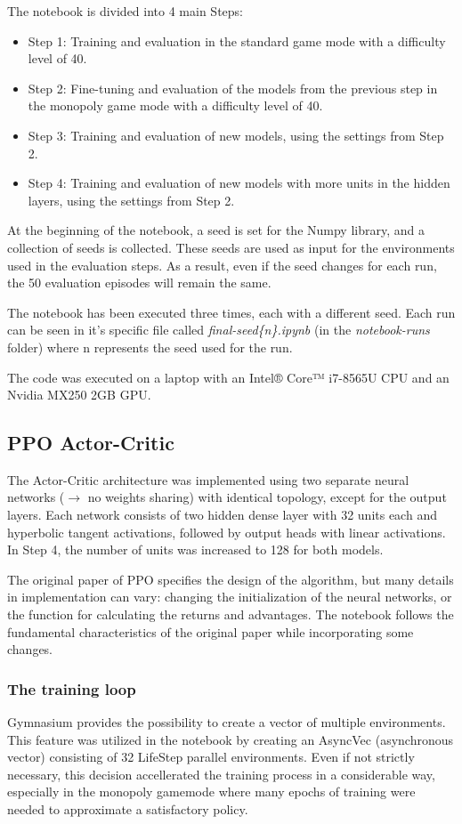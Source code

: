 \documentclass{article}
\begin{document}
The notebook is divided into 4 main Steps:
\begin{itemize}
    \item Step 1: Training and evaluation in the standard game mode with a difficulty level of 40.
    \item Step 2: Fine-tuning and evaluation of the models from the previous step in the monopoly game mode with a difficulty level of 40.
    \item Step 3: Training and evaluation of new models, using the settings from Step 2.
    \item Step 4: Training and evaluation of new models with more units in the hidden layers, using the settings from Step 2.
\end{itemize}

At the beginning of the notebook, a seed is set for the Numpy library, and a collection of seeds is collected. These seeds are used as input for the environments used in the evaluation steps. As a result, even if the seed changes for each run, the 50 evaluation episodes will remain the same.

The notebook has been executed three times, each with a different seed. Each run can be seen in it's specific file called \textit{final-seed\{n\}.ipynb} (in the \textit{notebook-runs} folder) where n represents the seed used for the run. 

The code was executed on a laptop with an Intel® Core™ i7-8565U CPU and an Nvidia MX250 2GB GPU.


\subsection{PPO Actor-Critic}
The Actor-Critic architecture was implemented using two separate neural networks (\(\rightarrow\) no weights sharing) with identical topology, except for the output layers. Each network consists of two hidden dense layer with 32 units each and hyperbolic tangent activations, followed by output heads with linear activations. In Step 4, the number of units was increased to 128 for both models.

The original paper of PPO specifies the design of the algorithm, but many details in implementation can vary: changing the initialization of the neural networks, or the function for calculating the returns and advantages. The notebook follows the fundamental characteristics of the original paper while incorporating some changes.


\subsubsection{The training loop} \label{trainingloop}
Gymnasium provides the possibility to create a vector of multiple environments. This feature was utilized in the notebook by creating an AsyncVec (asynchronous vector) consisting of 32 LifeStep parallel environments. Even if not strictly necessary, this decision accellerated the training process in a considerable way, especially in the monopoly gamemode where many epochs of training were needed to approximate a satisfactory policy.
\end{document}
